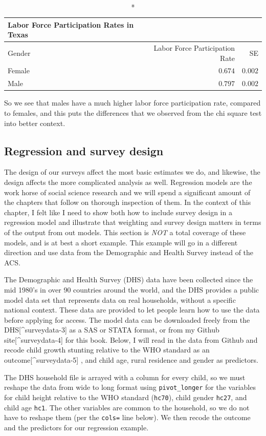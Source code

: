 \documentclass[
  letterpaper,
  DIV=11,
  numbers=noendperiod]{scrreprt}
\begin{document}
\begin{longtable*}{lrr}
\caption*{
{\large Labor Force Participation Rates in Texas}
} \\ 
\toprule
Gender & Labor Force Participation Rate & SE \\ 
\midrule
Female & $0.674$ & $0.002$ \\ 
Male & $0.797$ & $0.002$ \\ 
\bottomrule
\end{longtable*}

So we see that males have a much higher labor force participation rate,
compared to females, and this puts the differences that we observed from
the chi square test into better context.

\hypertarget{regression-and-survey-design}{%
\subsection{Regression and survey
design}\label{regression-and-survey-design}}

The design of our surveys affect the most basic estimates we do, and
likewise, the design affects the more complicated analysis as well.
Regression models are the work horse of social science research and we
will spend a significant amount of the chapters that follow on thorough
inspection of them. In the context of this chapter, I felt like I need
to show both how to include survey design in a regression model and
illustrate that weighting and survey design matters in terms of the
output from out models. This section is \emph{NOT} a total coverage of
these models, and is at best a short example. This example will go in a
different direction and use data from the Demographic and Health Survey
instead of the ACS.

The Demographic and Health Survey (DHS) data have been collected since
the mid 1980's in over 90 countries around the world, and the DHS
provides a public model data set that represents data on real
households, without a specific national context. These data are provided
to let people learn how to use the data before applying for access. The
model data can be downloaded freely from the DHS{[}\^{}surveydata-3{]}
as a SAS or STATA format, or from my Github site{[}\^{}surveydata-4{]}
for this book. Below, I will read in the data from Github and recode
child growth stunting relative to the WHO standard as an
outcome{[}\^{}surveydata-5{]} , and child age, rural residence and
gender as predictors.

The DHS household file is arrayed with a column for every child, so we
must reshape the data from wide to long format using
\texttt{pivot\_longer} for the variables for child height relative to
the WHO standard (\texttt{hc70}), child gender \texttt{hc27}, and child
age \texttt{hc1}. The other variables are common to the household, so we
do not have to reshape them (per the \texttt{cols=} line below). We then
recode the outcome and the predictors for our regression example.
\end{document}

